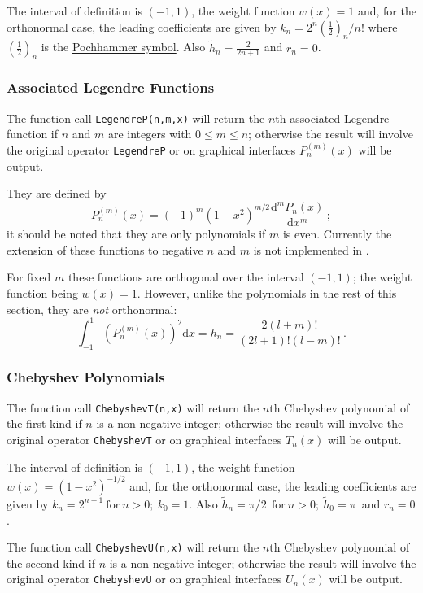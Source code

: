The interval of definition is $(-1, 1)$, the weight function $w(x)=1$ and,
for the orthonormal case, the leading coefficients are given by
$k_n=2^n (\frac{1}{2})_n/n!$ where $(\frac{1}{2})_n$ is the
\hyperlink{POCH}{Pochhammer symbol}.
Also $\tilde{h}_n = \frac{2}{2 n +1}$ and $r_n =0$.

\subsubsection{Associated Legendre Functions}
The function call \texttt{LegendreP(n,m,x)} will return the $n$th associated
Legendre function if $n$ and $m$ are integers with $0 \leq m \leq n$;
otherwise the result will involve the original operator \texttt{LegendreP} or
on graphical interfaces $P_n^{(m)}(x)$ will be output.

They are defined by
\[P_n^{(m)}(x) = (-1)^m(1-x^2)^{m/2}\frac{\mathrm{d}^m P_n(x)}{\mathrm{d}x^m}\,;\]
it should be noted that they are only polynomials if $m$ is even. Currently
the extension of these functions to negative $n$ and $m$ is not implemented
in \REDUCE.

For fixed $m$ these functions are orthogonal over the interval $(-1, 1)$;
the weight function being $w(x)=1$. However, unlike the polynomials in the rest
of this section, they are \emph{not} orthonormal:
\[\int_{-1}^1 \left(P_n^{(m)}(x)\right)^2 \mathrm{d}x = h_n =
\frac{2(l+m)!}{(2l+1)!(l-m)!}\,.\]

\subsubsection{Chebyshev Polynomials}
\hypertarget{CHEBYSHEVP}{}
 
The function call \texttt{ChebyshevT(n,x)} will return the $n$th Chebyshev
polynomial of the first kind if $n$ is a non-negative integer; otherwise the
result will involve the original operator \texttt{ChebyshevT} or on graphical
interfaces $T_n(x)$ will be output.

The interval of definition is $(-1, 1)$, the weight function
$w(x)=(1-x^2)^{-1/2}$ and, for the orthonormal case, the leading
coefficients are given by $k_n= 2^{n-1}\ \mbox{for}\ n>0;\ k_0 =1$. Also
$\tilde{h}_n = \pi/2\ \ \mbox{for}\ n>0;\ \tilde{h}_0 =\pi\,$ and $r_n=0$.

The function call \texttt{ChebyshevU(n,x)} will return the $n$th Chebyshev
polynomial of the second kind if $n$ is a non-negative integer; otherwise the
result will involve the original operator \texttt{ChebyshevU} or on graphical
interfaces $U_n(x)$ will be output.

